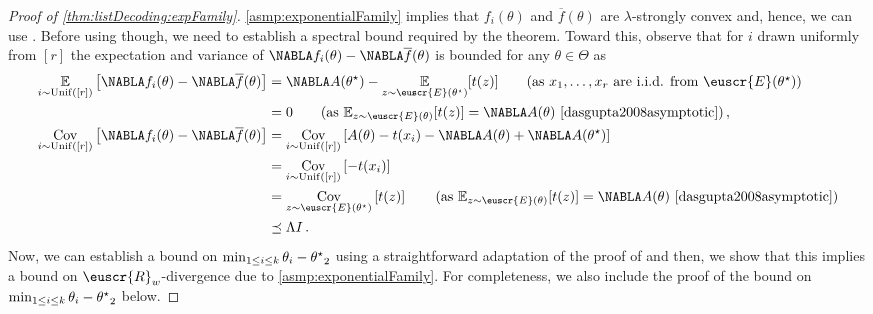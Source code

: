 \documentclass[11pt]{article}
\theoremstyle{plain}
\theoremstyle{definition}
\theoremstyle{remark}
\newcommand{\insquare}[1]{\left[#1\right]}
\let\norm\relax
\newcommand{\norm}[1]{\ensuremath{\left\lVert #1 \right\rVert}}
\newcommand{\E}{\operatornamewithlimits{\mathbb{E}}}
\newcommand{\Ex}{\E}
\newcommand{\cov}{\ensuremath{\operatornamewithlimits{\rm Cov}}}
\newcommand{\iid}{i.i.d.}
\newcommand{\unif}{{\rm Unif}}
\newcommand*{\Nabla}{\boldsymbol\NABLA}
\let\nabla\Nabla
\newcommand{\customcal}[1]{\euscr{#1}}
\newcommand{\cE}{\customcal{E}}
\newcommand{\cR}{\customcal{R}}
\begin{document}
\begin{proof}[Proof of \cref{thm:listDecoding:expFamily}]
                \cref{asmp:exponentialFamily} implies that $f_i(\theta)$ and $\overline{f}(\theta)$ are $\lambda$-strongly convex and, hence, we can use \cite[Theorem 6.1]{charikar2017learning}.
                Before using \cite[Theorem 6.1]{charikar2017learning} though, we need to establish a spectral bound required by the theorem.
                Toward this, observe that for $i$ drawn uniformly from $[r]$ the expectation and variance of $\nabla f_i(\theta) - \nabla \overline{f}(\theta)$ is bounded for any $\theta\in \Theta$ as
                \begin{align*}
                    \Ex_{i\sim \unif{}([r])}\insquare{\nabla f_i(\theta) - \nabla \overline{f}(\theta)} 
                        &= \nabla A(\theta^\star) - \Ex_{z\sim \cE(\theta^\star)}[t(z)]
                        \tag{as $x_1,\dots,x_r$ are \iid{} from $\cE(\theta^\star)$}\\
                        &= 0 \tag{as $\Ex_{z\sim \cE(\theta)}[t(z)]=\nabla A(\theta)$ \cite{dasgupta2008asymptotic}}\,,\\
                    \cov_{i\sim \unif{}([r])}\insquare{\nabla f_i(\theta) - \nabla \overline{f}(\theta)} 
                    &= \cov_{i\sim \unif{}([r])}\insquare{
                        A(\theta) - t(x_i)
                        - \nabla A(\theta) + \nabla A(\theta^\star)
                    }\\
                    &= \cov_{i\sim \unif{}([r])}\insquare{
                        - t(x_i)
                    }\\
                    &=\cov_{z\sim \cE(\theta^\star)}\insquare{t(z)}\tag{as $\Ex_{z\sim \cE(\theta)}[t(z)]=\nabla A(\theta)$ \cite{dasgupta2008asymptotic}}\\
                    &\preceq \Lambda I\,.
                \end{align*}
                Now, we can establish a bound on $\min_{1\leq i\leq k}\norm{\theta_i-\theta^\star}_2$ using a straightforward adaptation of the proof of \cite[Corollary 9.1]{charikar2017learning} and then, we show that this implies a bound on $\cR_{w}$-divergence due to \cref{asmp:exponentialFamily}. 
                For completeness, we also include the proof of the bound on $\min_{1\leq i\leq k}\norm{\theta_i-\theta^\star}_2$ below. %
                

\end{proof}
\end{document}
